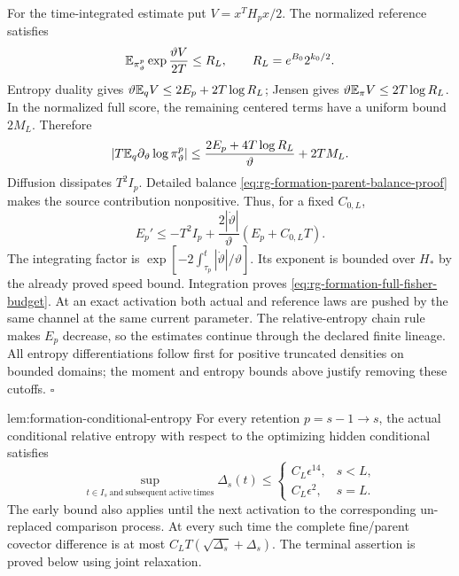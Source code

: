 For the time-integrated estimate put $V=x^TH_px/2$.
The normalized reference satisfies
\begin{equation}
 \mathbb E_{\pi_\vartheta^p}\exp\frac{\vartheta V}{2T}
 \le R_L,\qquad R_L=e^{B_0}2^{k_0/2}.
 \label{eq:rg-formation-energy-exponential-moment}
\end{equation}
Entropy duality gives
$\vartheta\mathbb E_qV\le2E_p+2T\log R_L$; Jensen gives
$\vartheta\mathbb E_\pi V\le2T\log R_L$. In the normalized full score,
the remaining centered terms have a uniform bound $2M_L$.
Therefore
\begin{equation}
 |T\mathbb E_q\partial_\vartheta\log\pi_\vartheta^p|
 \le\frac{2E_p+4T\log R_L}{\vartheta}+2TM_L.
 \label{eq:rg-formation-entropy-parameter-budget}
\end{equation}
Diffusion dissipates $T^2I_p$. Detailed balance
\cref{eq:rg-formation-parent-balance-proof} makes the source
contribution nonpositive. Thus, for a fixed $C_{0,L}$,
\begin{equation}
 E_p'\le -T^2I_p+
    \frac{2|\dot\vartheta|}{\vartheta}(E_p+C_{0,L}T).
 \label{eq:rg-formation-entropy-energy-inequality}
\end{equation}
The integrating factor is
$\exp[-2\int_{\tau_p}^t|\dot\vartheta|/\vartheta]$.
Its exponent is bounded over $H_*$ by the already proved speed
bound. Integration proves \cref{eq:rg-formation-full-fisher-budget}.
At an exact activation both actual and reference laws are pushed by
the same channel at the same current parameter. The relative-entropy
chain rule makes $E_p$ decrease, so the estimates continue through
the declared finite lineage. All entropy differentiations follow
first for positive truncated densities on bounded domains; the
moment and entropy bounds above justify removing these cutoffs.
\hfill$\square$

{lem:formation-conditional-entropy}
For every retention $p=s-1\to s$, the actual conditional relative
entropy with respect to the optimizing hidden conditional satisfies
\begin{equation}
 \sup_{t\in I_s\ \mathrm{and\ subsequent\ active\ times}}
 \Delta_s(t)
 \le
 \begin{cases}
 C_L\epsilon^{14},&s<L,\\
 C_L\epsilon^2,&s=L.
 \end{cases}
 \label{eq:rg-formation-conditional-final-bounds}
\end{equation}
The early bound also applies until the next activation to the
corresponding un-replaced comparison process. At every such time
the complete fine/parent covector difference is at most
$C_LT(\sqrt{\Delta_s}+\Delta_s)$.
The terminal assertion is proved below using joint relaxation.

